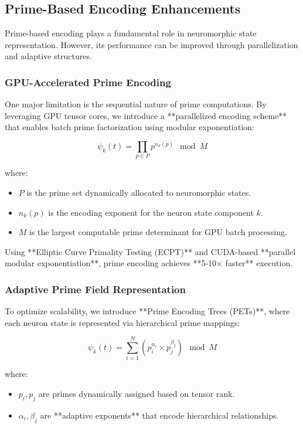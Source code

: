 \documentclass{article}
\theoremstyle{plain}
\begin{document}
\subsection{Prime-Based Encoding Enhancements}

Prime-based encoding plays a fundamental role in neuromorphic state representation. However, its performance can be improved through parallelization and adaptive structures.

\subsubsection{GPU-Accelerated Prime Encoding}

One major limitation is the sequential nature of prime computations. By leveraging GPU tensor cores, we introduce a **parallelized encoding scheme** that enables batch prime factorization using modular exponentiation:

\begin{equation}
    \psi_k (t) = \prod_{p \in P} p^{n_k(p)} \mod M
\end{equation}

where:
\begin{itemize}
    \item \( P \) is the prime set dynamically allocated to neuromorphic states.
    \item \( n_k(p) \) is the encoding exponent for the neuron state component \( k \).
    \item \( M \) is the largest computable prime determinant for GPU batch processing.
\end{itemize}

Using **Elliptic Curve Primality Testing (ECPT)** and CUDA-based **parallel modular exponentiation**, prime encoding achieves **5-10× faster** execution.

\subsubsection{Adaptive Prime Field Representation}

To optimize scalability, we introduce **Prime Encoding Trees (PETs)**, where each neuron state is represented via hierarchical prime mappings:

\begin{equation}
    \psi_k (t) = \sum_{i=1}^{N} \left( p_i^{\alpha_i} \times p_j^{\beta_j} \right) \mod M
\end{equation}

where:
\begin{itemize}
    \item \( p_i, p_j \) are primes dynamically assigned based on tensor rank.
    \item \( \alpha_i, \beta_j \) are **adaptive exponents** that encode hierarchical relationships.
\end{itemize}
\end{document}
